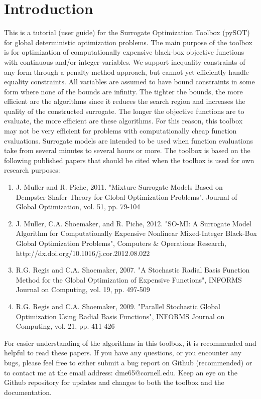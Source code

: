\documentclass[]{article}
\begin{document}
\section{Introduction}
This is a tutorial (user guide) for the Surrogate Optimization Toolbox (pySOT) for global deterministic optimization problems. The main purpose of the toolbox is for optimization of computationally expensive black-box objective functions with continuous and/or integer variables. We support inequality constraints of any form through a penalty method approach, but cannot yet efficiently handle equality constraints. All variables are assumed to have bound constraints in some form where none of the bounds are infinity. The tighter the bounds, the more efficient are the algorithms since it reduces the search region and increases the quality of the constructed surrogate. The longer the objective functions are to evaluate, the more efficient are these algorithms. For this reason, this toolbox may not be very efficient for problems with computationally cheap function evaluations. Surrogate models are intended to be used when function evaluations take from several minutes to several hours or more. The toolbox is based on the following published papers that should be cited when the toolbox is used for own research purposes:
\begin{enumerate}
\item J. Muller and R. Piche, 2011. "Mixture Surrogate Models Based on Dempster-Shafer Theory for Global Optimization Problems", Journal of Global Optimization, vol. 51, pp. 79-104
\item J. Muller, C.A. Shoemaker, and R. Piche, 2012. "SO-MI: A Surrogate Model Algorithm for Computationally Expensive Nonlinear Mixed-Integer Black-Box Global Optimization Problems", Computers \& Operations Research, \\ http://dx.doi.org/10.1016/j.cor.2012.08.022
\item R.G. Regis and C.A. Shoemaker, 2007. "A Stochastic Radial Basis Function Method for the Global Optimization of Expensive Functions", INFORMS Journal on Computing, vol. 19, pp. 497-509
\item R.G. Regis and C.A. Shoemaker, 2009. "Parallel Stochastic Global Optimization Using Radial Basis Functions", INFORMS Journal on Computing, vol. 21, pp. 411-426
\end{enumerate}
For easier understanding of the algorithms in this toolbox, it is recommended and helpful to read these papers. If you have any questions, or you encounter any bugs, please feel free to either submit a bug report on Github (recommended) or to contact me at the email address: dme65@cornell.edu. Keep an eye on the Github repository for updates and changes to both the toolbox and the documentation.
\end{document}
